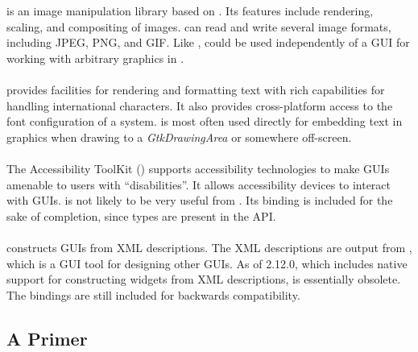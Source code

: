 \documentclass[article]{jss}
\begin{document}
 is an image manipulation library based on .
Its features
include rendering, scaling, and compositing of images. 
can read
and write several image formats, including JPEG, PNG, and GIF. Like
,
 could be used independently of a GUI for working with
arbitrary 
graphics in . 

\paragraph[Pango]{}

 provides facilities for rendering and formatting text with
rich capabilities for handling international characters. It also
provides cross-platform access to the font configuration of a system.
 is most often used directly for embedding text in graphics
when drawing to a \emph{GtkDrawingArea} or somewhere off-screen.

\paragraph[ATK]{} 

The Accessibility ToolKit () supports accessibility
technologies to make GUIs amenable to users with ``disabilities''.  It
allows accessibility devices to interact with 
GUIs.  is not likely to be very useful from . Its
binding is included for the sake of completion, since  types
are present in the  API.

\paragraph[Libglade]{}

 constructs  GUIs from XML descriptions.
The XML descriptions are output from
, which is a GUI tool for designing other GUIs. 
As of  2.12.0, which includes native support for
constructing widgets from XML descriptions,  is
essentially obsolete. The bindings are still included for backwards
compatibility.

\subsection[A GObject Primer]{A 
Primer}\label{sec:primer}
\end{document}
